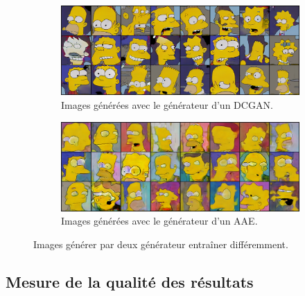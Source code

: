 \documentclass[11pt,francais]{article}
\begin{document}
\begin{figure}[!h]
 \centering
    \begin{subfigure}[b]{\textwidth}
        \includegraphics[width=\textwidth]{Figures/resultats_simpsons/DCGAN_270.png}
        \caption{Images générées avec le générateur d'un DCGAN.}
        \label{fig:fig3}
    \end{subfigure}
    \begin{subfigure}[b]{\textwidth}
        \includegraphics[width=\textwidth]{Figures/resultats_simpsons/AAE_300.png}
        \caption{Images générées avec le générateur d'un AAE.}
        \label{fig:fig4}
    \end{subfigure}
    \caption{Images générer par deux générateur entraîner différemment.}
\end{figure}

\subsection{Mesure de la qualité des résultats}
\label{sec:Mesure}
\end{document}
